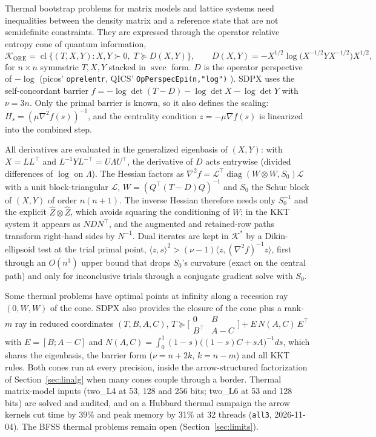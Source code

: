 \documentclass[11pt]{article}
\newcommand{\K}{\mathcal{K}}
\newcommand{\svec}{\operatorname{svec}}
\newcommand{\code}[1]{\texttt{#1}}
\begin{document}
Thermal bootstrap problems for matrix models and lattice systems need
inequalities between the density matrix and a reference state that are not
semidefinite constraints. They are expressed through the operator relative
entropy cone of quantum information,
\begin{equation}
  \mathcal{K}_{\mathrm{ORE}} = \operatorname{cl}\bigl\{(T,X,Y) :
  X, Y \succ 0,\; T \succeq D(X,Y)\bigr\},\qquad
  D(X,Y) = -X^{1/2}\log\!\bigl(X^{-1/2} Y X^{-1/2}\bigr)X^{1/2},
\end{equation}
for $n\times n$ symmetric $T,X,Y$ stacked in $\svec$ form. $D$ is the operator
perspective of $-\log$ (picos' \code{oprelentr}, QICS'
\code{OpPerspecEpi(n,"log")} \cite{HeSaundersonFawziQICS}). SDPX uses the
self-concordant barrier
$f = -\log\det(T-D) - \log\det X - \log\det Y$ with $\nu = 3n$. Only the
primal barrier is known, so it also defines the scaling: $H_s =
(\mu\nabla^2 f(s))^{-1}$, and the centrality condition $z = -\mu\nabla f(s)$
is linearized into the combined step.

All derivatives are evaluated in the generalized eigenbasis of $(X,Y)$:
with $X = LL^\top$ and $L^{-1}YL^{-\top} = U\Lambda U^\top$, the derivative
of $D$ acts entrywise (divided differences of $\log$ on $\Lambda$). The
Hessian factors as $\nabla^2 f = \mathcal{L}^\top
\operatorname{diag}(W\otimes W, S_0)\mathcal{L}$ with a unit block-triangular
$\mathcal{L}$, $W = (Q^\top(T-D)Q)^{-1}$ and $S_0$ the Schur block of
$(X,Y)$ of order $n(n+1)$. The inverse Hessian therefore needs only $S_0^{-1}$
and the explicit $\hat Z\otimes \hat Z$, which avoids squaring the
conditioning of $W$; in the KKT system it appears as $N D N^\top$, and the
augmented and retained-row paths transform right-hand sides by $N^{-1}$.
Dual iterates are kept in $\K^*$ by a Dikin-ellipsoid test at the trial
primal point, $\langle z,s\rangle^2 > (\nu-1)\langle z,(\nabla^2f)^{-1}z\rangle$,
first through an $O(n^3)$ upper bound that drops $S_0$'s curvature (exact on
the central path) and only for inconclusive trials through a conjugate
gradient solve with $S_0$.

Some thermal problems have optimal points at infinity along a recession ray
$(0,W,W)$ of the cone. SDPX also provides the closure of the cone plus a
rank-$m$ ray in reduced coordinates $(T,B,A,C)$,
$T \succeq \bigl[\begin{smallmatrix}0 & B\\ B^\top & A-C\end{smallmatrix}\bigr]
+ E\,N(A,C)\,E^\top$ with $E = [B; A-C]$ and
$N(A,C) = \int_0^1 (1-s)\bigl((1-s)C+sA\bigr)^{-1}ds$, which shares the
eigenbasis, the barrier form ($\nu = n+2k$, $k=n-m$) and all KKT rules.
Both cones run at every precision, inside the arrow-structured factorization
of Section~\ref{sec:linalg} when many cones couple through a border.
Thermal matrix-model inputs (two\_L4 at 53, 128 and 256 bits; two\_L6 at 53
and 128 bits) are solved and audited, and on a Hubbard thermal campaign the
arrow kernels cut time by 39\% and peak memory by 31\% at 32 threads
(\code{all3}, 2026-11-04). The BFSS thermal problems remain open
(Section~\ref{sec:limits}).
\end{document}
